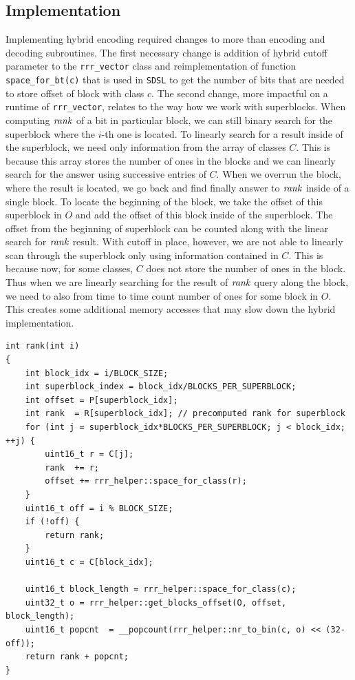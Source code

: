 \subsection{Implementation}

Implementing hybrid encoding required changes to more than encoding and decoding
subroutines. The first necessary change is addition of hybrid cutoff parameter
to the \texttt{rrr\_vector} class and reimplementation of function \texttt{space\_for\_bt(c)}
that is used in \texttt{SDSL} to get the number of bits that are needed to store offset
of block with class $c$. The second change, more impactful on a runtime
of \texttt{rrr\_vector}, relates to the way how we work with superblocks. When
computing $\mathit{rank}$ of a bit in particular block, we can still binary search for
the superblock where the $i$-th one is located. To linearly search for a result
inside of the superblock, we need only information from the array of classes $C$.
This is because this array stores the number of ones in the blocks and we can linearly
search for the answer using successive entries of $C$. When we overrun the block, where
the result is located, we go back and find finally answer to $\mathit{rank}$ inside of a
single block. To locate the beginning of the block, we take the offset of this superblock
in $O$ and add the offset of this block inside of the superblock. The offset from the
beginning of superblock can be counted along with the linear search for $\mathit{rank}$ result.
With cutoff in place, however, we are not able to linearly scan through the superblock
only using information contained in $C$. This is because now, for some classes, $C$ does
not store the number of ones in the block. Thus when we are linearly searching for the result
of $\mathit{rank}$ query along the block, we need to also from time to time count number of ones
for some block in $O$. This creates some additional memory accesses that may slow down the
hybrid implementation.

\begin{lstlisting}
int rank(int i)
{
	int block_idx = i/BLOCK_SIZE;
	int superblock_index = block_idx/BLOCKS_PER_SUPERBLOCK;
	int offset = P[superblock_idx];
	int rank  = R[superblock_idx]; // precomputed rank for superblock
	for (int j = superblock_idx*BLOCKS_PER_SUPERBLOCK; j < block_idx; ++j) {
		uint16_t r = C[j];
		rank  += r;
		offset += rrr_helper::space_for_class(r);
	}
	uint16_t off = i % BLOCK_SIZE;
	if (!off) {
		return rank;
	}
	uint16_t c = C[block_idx];

	uint16_t block_length = rrr_helper::space_for_class(c);
	uint32_t o = rrr_helper::get_blocks_offset(O, offset, block_length);
	uint16_t popcnt  = __popcount(rrr_helper::nr_to_bin(c, o) << (32-off));
	return rank + popcnt;
}
\end{lstlisting}

